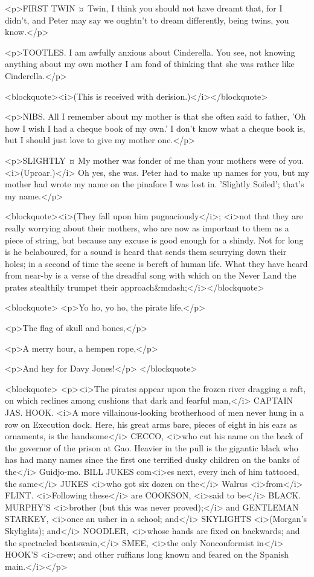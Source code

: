 <p>FIRST TWIN ¤
Twin, I think you should not have dreamt that, for I didn't, and Peter may say we oughtn't to dream differently, being twins, you know.</p>

<p>TOOTLES. I am awfully anxious about Cinderella. You see, not knowing anything about my own mother I am fond of thinking that she was rather like Cinderella.</p>

<blockquote><i>(This is received with derision.)</i></blockquote>

<p>NIBS. All I remember about my mother is that she often said to father, 'Oh how I wish I had a cheque book of my own.' I don't know what a cheque book is, but I should just love to give my mother one.</p>

<p>SLIGHTLY ¤
My mother was fonder of me than your mothers were of you. <i>(Uproar.)</i> Oh yes, she was. Peter had to make up names for you, but my mother had wrote my name on the pinafore I was lost in. 'Slightly Soiled'; that's my name.</p>

<blockquote><i>(They fall upon him pugnaciously</i>; <i>not that they are really worrying about their mothers, who are now as important to them as a piece of string, but because any excuse is good enough for a shindy. Not for long is he belaboured, for a sound is heard that sends them scurrying down their holes; in a second of time the scene is bereft of human life. What they have heard from near-by is a verse of the dreadful song with which on the Never Land the prates stealthily trumpet their approach&mdash;</i></blockquote>

<blockquote> <p>Yo ho, yo ho, the pirate life,</p>

<p>The flag of skull and bones,</p>

<p>A merry hour, a hempen rope,</p>

<p>And hey for Davy Jones!</p> </blockquote>

<blockquote> <p><i>The pirates appear upon the frozen river dragging a raft, on which reclines among cushions that dark and fearful man,</i> CAPTAIN JAS. HOOK. <i>A more villainous-looking brotherhood of men never hung in a row on Execution dock. Here, his great arms bare, pieces of eight in his ears as ornaments, is the handsome</i> CECCO, <i>who cut his name on the back of the governor of the prison at Gao. Heavier in the pull is the gigantic black who has had many names since the first one terrified dusky children on the banks of the</i> Guidjo-mo. BILL JUKES com<i>es next, every inch of him tattooed, the same</i> JUKES <i>who got six dozen on the</i> Walrus <i>from</i> FLINT. <i>Following these</i> are COOKSON, <i>said to be</i> BLACK. MURPHY'S <i>brother (but this was never proved);</i> and GENTLEMAN STARKEY, <i>once an usher in a school; and</i> SKYLIGHTS <i>(Morgan's Skylights); and</i> NOODLER, <i>whose hands are fixed on backwards; and the spectacled boatswain,</i> SMEE, <i>the only Nonconformist in</i> HOOK'S <i>crew; and other ruffians long known and feared on the Spanish main.</i></p>


